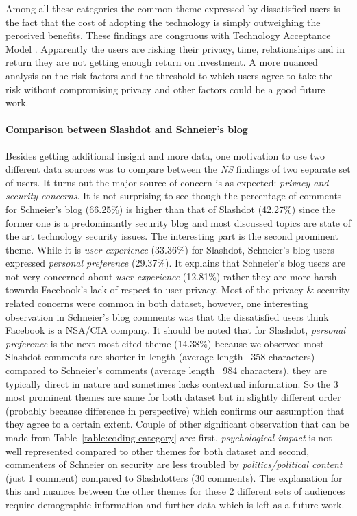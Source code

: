 Among all these categories the common theme expressed by dissatisfied users is the fact that the cost of adopting the technology is simply outweighing the perceived benefits. These findings are congruous with Technology Acceptance Model \cite{venkatesh2003user, davis1989perceived}. Apparently the users are risking their privacy, time, relationships and in return they are not getting enough return on investment. A more nuanced analysis on the risk factors and the threshold to which users agree to take the risk without compromising privacy and other factors could be a good future work. 


\paragraph{Comparison between Slashdot and Schneier's blog} 

Besides getting additional insight and more data, one motivation to use two different data sources was to compare between the \emph{NS} findings of two separate set of users. It turns out the major source of concern is as expected: \textit{privacy and security concerns}. It is not surprising to see though the percentage of comments for Schneier's blog (66.25\%) is higher than that of Slashdot (42.27\%) since the former one is a predominantly security blog and most discussed topics are state of the art technology security issues. The interesting part is the second prominent theme. While it is \textit{user experience} (33.36\%) for Slashdot, Schneier's blog users expressed \textit{personal preference} (29.37\%). It explains that Schneier's blog users are not very concerned about \textit{user experience} (12.81\%) rather they are more harsh towards Facebook's lack of respect to user privacy. Most of the privacy \& security related concerns were common in both dataset, however, one interesting observation in Schneier's blog comments was that the dissatisfied users think Facebook is a NSA/CIA company. It should be noted that for Slashdot, \textit{personal preference} is the next most cited theme (14.38\%) because we observed most Slashdot comments are shorter in length (average length ~358 characters) compared to Schneier's comments (average length ~984 characters), they are typically direct in nature and sometimes lacks contextual information. So the 3 most prominent themes are same for both dataset but in slightly different order (probably because difference in perspective) which confirms our assumption that they agree to a certain extent. Couple of other significant observation that can be made from Table~\ref{table:coding category} are: first, \textit{psychological impact} is not well represented compared to other themes for both dataset and second, commenters of Schneier on security are less troubled by \textit{politics/political content} (just 1 comment) compared to Slashdotters (30 comments). The explanation for this and nuances between the other themes for these 2 different sets of audiences require demographic information and further data which is left as a future work.



